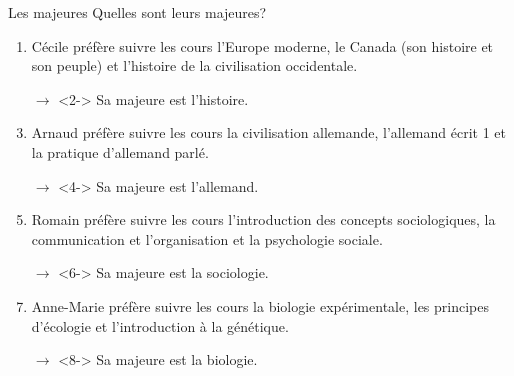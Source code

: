 \begin{frame}{Les majeures}
  Quelles sont leurs majeures?
  \begin{enumerate}
    \item Cécile préfère suivre les cours l'Europe moderne, le Canada (son histoire et son peuple) et l'histoire de la civilisation occidentale.
    \item[$\to$]<2-> Sa majeure est l'histoire.
    \item<3-> Arnaud préfère suivre les cours la civilisation allemande, l'allemand écrit 1 et la pratique d'allemand parlé.
    \item[$\to$]<4-> Sa majeure est l'allemand.
    \item<5-> Romain préfère suivre les cours l'introduction des concepts sociologiques, la communication et l'organisation et la psychologie sociale.
    \item[$\to$]<6-> Sa majeure est la sociologie.
    \item<7-> Anne-Marie préfère suivre les cours la biologie expérimentale, les principes d'écologie et l'introduction à la génétique.
    \item[$\to$]<8-> Sa majeure est la biologie.
  \end{enumerate}
\end{frame}